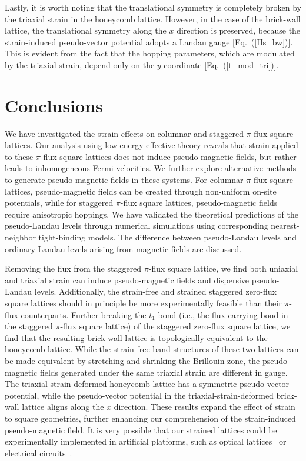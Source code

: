 \documentclass[aps, twocolumn, floatfix, superscriptaddress, prb]{revtex4-1}
\begin{document}
Lastly, it is worth noting that the translational symmetry is completely broken by the triaxial strain in the honeycomb lattice. However, in the case of the brick-wall lattice, the translational symmetry along the $x$ direction is preserved, because the strain-induced pseudo-vector potential adopts a Landau gauge [Eq.~(\ref{Hs_bw})]. This is evident from the fact that the hopping parameters, which are modulated by the triaxial strain, depend only on the $y$ coordinate [Eq.~(\ref{t_mod_tri})].


\section{Conclusions}
\label{sec8}
We have investigated the strain effects on columnar and staggered $\pi$-flux square lattices. Our analysis using low-energy effective theory reveals that strain applied to these $\pi$-flux square lattices does not induce pseudo-magnetic fields, but rather leads to inhomogeneous Fermi velocities. We further explore alternative methods to generate pseudo-magnetic fields in these systems. For columnar $\pi$-flux square lattices, pseudo-magnetic fields can be created through non-uniform on-site potentials, while for staggered $\pi$-flux square lattices, pseudo-magnetic fields require anisotropic hoppings. We have validated the theoretical predictions of the pseudo-Landau levels through numerical simulations using corresponding nearest-neighbor tight-binding models. The difference between pseudo-Landau levels and ordinary Landau levels arising from magnetic fields are discussed.

Removing the flux from the staggered $\pi$-flux square lattice, we find both uniaxial and triaxial strain can induce pseudo-magnetic fields and dispersive pseudo-Landau levels. Additionally, the strain-free and strained staggered zero-flux square lattices should in principle be more experimentally feasible than their $\pi$-flux counterparts. Further breaking the $t_1$ bond (i.e., the flux-carrying bond in the staggered $\pi$-flux square lattice) of the staggered zero-flux square lattice, we find that the resulting brick-wall lattice is topologically equivalent to the honeycomb lattice. While the strain-free band structures of these two lattices can be made equivalent by stretching and shrinking the Brillouin zone, the pseudo-magnetic fields generated under the same triaxial strain are different in gauge. The triaxial-strain-deformed honeycomb lattice has a symmetric pseudo-vector potential, while the pseudo-vector potential in the triaxial-strain-deformed brick-wall lattice aligns along the $x$ direction.
These results expand the effect of strain to square geometries, further enhancing our comprehension of the strain-induced pseudo-magnetic field. It is very possible that our strained lattices could be experimentally implemented in artificial platforms, such as optical lattices~\cite{aidelsburger2013, miyake2013} or electrical circuits~\cite{lee2018}.
\end{document}
